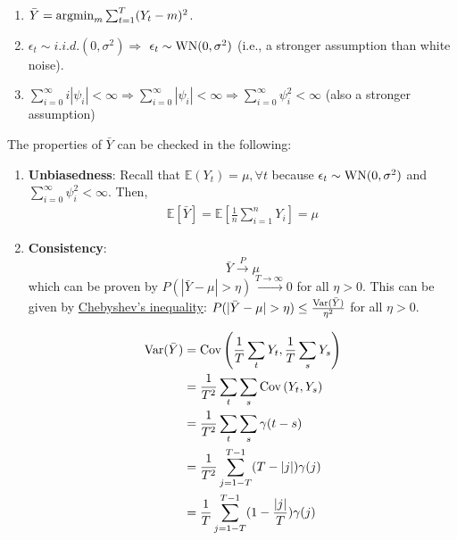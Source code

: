 \documentclass[11pt]{elegantbook}
\newcommand{\argmin}{\operatornamewithlimits{argmin}}
\begin{document}
\begin{note}
    \begin{enumerate}
        \item $\bar{Y}=\argmin_m\sum_{t=1}^T (Y_t-m)^2$.
        \item $\epsilon_t\sim i.i.d.(0,\sigma^2) \Rightarrow $ $\epsilon_t\sim \textnormal{WN}(0,\sigma^2)$ (i.e., a stronger assumption than white noise).
        \item $\sum_{i=0}^\infty i|\psi_i|<\infty \Rightarrow \sum_{i=0}^\infty |\psi_i|<\infty \Rightarrow \sum_{i=0}^\infty \psi_i^2<\infty$ (also a stronger assumption)
    \end{enumerate}
\end{note}
The properties of $\bar{Y}$ can be checked in the following:
\begin{enumerate}
    \item \textbf{Unbiasedness}: Recall that $\mathbb{E}(Y_t)=\mu, \forall t$ because $\epsilon_t\sim \textnormal{WN}(0,\sigma^2)$ and $\sum_{i=0}^\infty \psi_i^2<\infty$. Then,
    \begin{equation}
        \begin{aligned}
            \mathbb{E}[\bar{Y}]=\mathbb{E}[\frac{1}{n}\sum_{i=1}^n Y_i]=\mu
        \end{aligned}
        \nonumber
    \end{equation}
    \item \textbf{Consistency}: $$\bar{Y}\stackrel{P}{\longrightarrow}\mu$$ which can be proven by $P(|\bar{Y}-\mu|>\eta)\stackrel{T \rightarrow \infty}{\longrightarrow} 0$ for all $\eta>0$. This can be given by \underline{Chebyshev's inequality}: $P(|\bar{Y}-\mu|>\eta)\leq \frac{\textnormal{Var}(\bar{Y})}{\eta^2}$ for all $\eta>0$.
    \begin{claim}
        \begin{equation}
            \begin{aligned}
                \textnormal{Var}(\bar{Y})&=\textnormal{Cov}\left(\frac{1}{T}\sum_{t}Y_t, \frac{1}{T}\sum_{s}Y_s\right)\\
                &=\frac{1}{T^2}\sum_{t}\sum_{s}\textnormal{Cov}\left(Y_t,Y_s\right)\\
                &=\frac{1}{T^2}\sum_{t}\sum_{s}\gamma(t-s)\\
                &=\frac{1}{T^2}\sum_{j=1-T}^{T-1}(T-|j|)\gamma(j)\\
                &=\frac{1}{T}\sum_{j=1-T}^{T-1}(1-\frac{|j|}{T})\gamma(j)\\

\end{aligned}
\end{equation}
\end{claim}
\end{enumerate}
\end{document}
